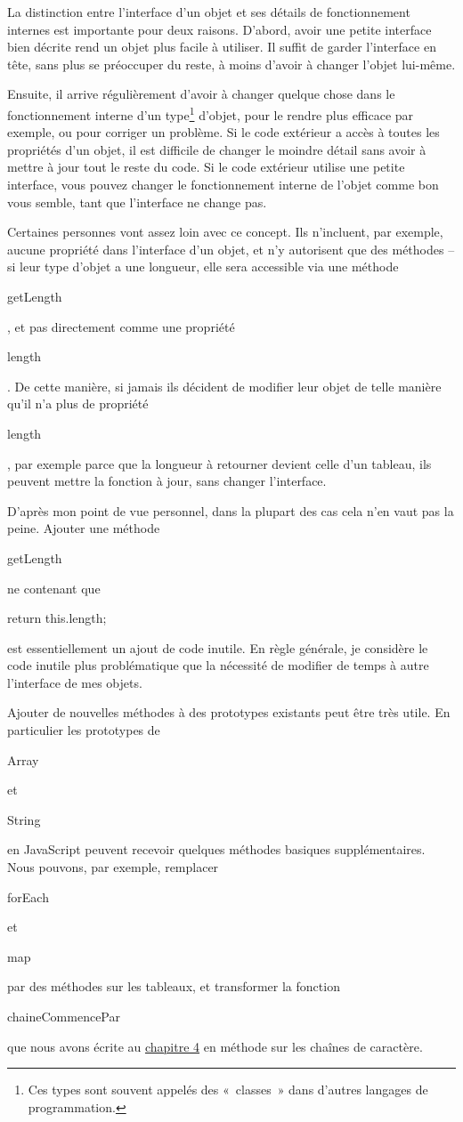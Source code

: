 \documentclass{FramateX}
\renewcommand{\texttt}[1]{\begin{sffamily}{#1}\end{sffamily}}
\begin{document}
\begin{center}\end{center}

La distinction entre l'interface d'un objet et ses détails de
fonctionnement internes est importante pour deux raisons. D'abord, avoir
une petite interface bien décrite rend un objet plus facile à utiliser.
Il suffit de garder l'interface en tête, sans plus se préoccuper du
reste, à moins d'avoir à changer l'objet lui-même.

Ensuite, il arrive régulièrement d'avoir à changer quelque chose dans le
fonctionnement interne d'un type\footnote{Ces types sont souvent appelés des «~classes~» dans d'autres langages de programmation.} d'objet, pour le rendre plus efficace par exemple, ou pour corriger un problème. Si le
code extérieur a accès à toutes les propriétés d'un objet, il est
difficile de changer le moindre détail sans avoir à mettre à jour tout
le reste du code. Si le code extérieur utilise une petite interface,
vous pouvez changer le fonctionnement interne de l'objet comme bon vous
semble, tant que l'interface ne change pas.

Certaines personnes vont assez loin avec ce concept. Ils n'incluent, par
exemple, aucune propriété dans l'interface d'un objet, et n'y autorisent
que des méthodes -- si leur type d'objet a une longueur, elle sera
accessible via une méthode \texttt{getLength}, et pas directement comme
une propriété \texttt{length}. De cette manière, si jamais ils décident
de modifier leur objet de telle manière qu'il n'a plus de propriété
\texttt{length}, par exemple parce que la longueur à retourner devient
celle d'un tableau, ils peuvent mettre la fonction à jour, sans changer
l'interface.

D'après mon point de vue personnel, dans la plupart des cas cela n'en
vaut pas la peine. Ajouter une méthode \texttt{getLength} ne contenant
que \texttt{return this.length;} est essentiellement un ajout de code
inutile. En règle générale, je considère le code inutile plus
problématique que la nécessité de modifier de temps à autre l'interface
de mes objets.

\begin{center}\end{center}

Ajouter de nouvelles méthodes à des prototypes existants peut être très
utile. En particulier les prototypes de \texttt{Array} et
\texttt{String} en JavaScript peuvent recevoir quelques méthodes
basiques supplémentaires. Nous pouvons, par exemple, remplacer
\texttt{forEach} et \texttt{map} par des méthodes sur les tableaux, et
transformer la fonction \texttt{chaineCommencePar} que nous avons écrite
au \href{chapter4.html}{chapitre 4} en méthode sur les chaînes de
caractère.
\end{document}
